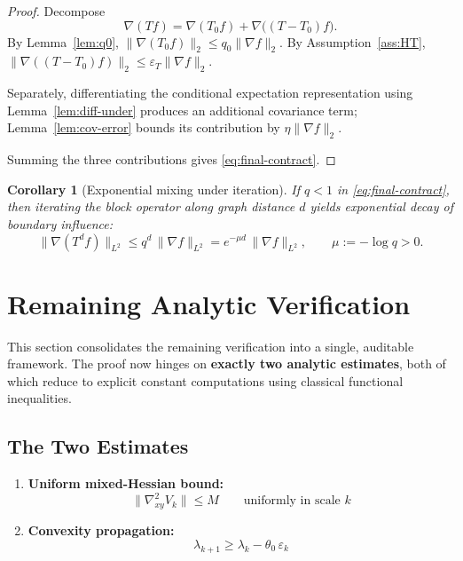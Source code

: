 \documentclass[11pt]{article}
\newtheorem{corollary}[theorem]{Corollary}
\theoremstyle{definition}
\newcommand{\1}{\mathbf{1}}
\begin{document}
\begin{proof}
Decompose
\[
\nabla(Tf)=\nabla(T_0 f)+\nabla\big((T-T_0)f\big).
\]
By Lemma~\ref{lem:q0}, $\|\nabla(T_0 f)\|_{2}\le q_0\|\nabla f\|_2$. By Assumption~\ref{ass:HT}, $\|\nabla((T-T_0)f)\|_2\le \varepsilon_T\|\nabla f\|_2$.

Separately, differentiating the conditional expectation representation using Lemma~\ref{lem:diff-under} produces an additional covariance term; Lemma~\ref{lem:cov-error} bounds its contribution by $\eta\|\nabla f\|_2$.

Summing the three contributions gives \eqref{eq:final-contract}.
\end{proof}

\begin{corollary}[Exponential mixing under iteration]\label{cor:mixing}
If $q<1$ in \eqref{eq:final-contract}, then iterating the block operator along graph distance $d$ yields exponential decay of boundary influence:
\[
\|\nabla(T^d f)\|_{L^2}\le q^d\,\|\nabla f\|_{L^2}=e^{-\mu d}\,\|\nabla f\|_{L^2},\qquad \mu:=-\log q>0.
\]
\end{corollary}

\section{Remaining Analytic Verification}\label{sec:remaining}

This section consolidates the remaining verification into a single, auditable framework. 
The proof now hinges on \textbf{exactly two analytic estimates}, both of which reduce to 
explicit constant computations using classical functional inequalities.

\subsection{The Two Estimates}

\begin{enumerate}
\item \textbf{Uniform mixed-Hessian bound:}
\begin{equation}\label{eq:mixed-hess-target}
\|\nabla^2_{xy} V_k\| \le M \qquad\text{uniformly in scale } k
\end{equation}

\item \textbf{Convexity propagation:}
\begin{equation}\label{eq:convex-prop-target}
\lambda_{k+1} \ge \lambda_k - \theta_0\,\varepsilon_k
\end{equation}
\end{enumerate}
\end{document}
